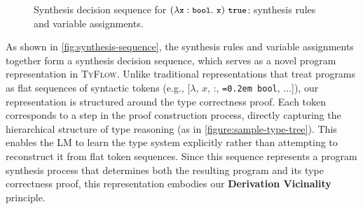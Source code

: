 \documentclass[manuscript,screen]{acmart}
\newcommand{\toolname}[1]{\textsc{#1}}
\newcommand{\tcode}[1]{{\small \texttt{\spaceskip=0.2em #1}}}
\newcommand{\mainname}{\toolname{TyFlow}\xspace}
\begin{document}
\begin{figure}[tb]
\centering
{}

\setlength{\fboxsep}{1pt}
\caption{Synthesis decision sequence for $\app{(\abs{\tcode{x}}{\tcode{bool}}{\tcode{x}})}{\tcode{true}}$: 
\colorbox{gray!15}{\textsf{synthesis rules}} and 
\colorbox{blue!8}{\textsf{variable assignments}}.}
\label{fig:synthesis-sequence}
\end{figure}

As shown in \autoref{fig:synthesis-sequence}, the synthesis rules and variable assignments together form a synthesis decision sequence, which serves as a novel program representation in \mainname. 
Unlike traditional representations that treat programs as flat sequences of syntactic tokens (e.g., [$\lambda$, $x$, :, \tcode{bool}, $\dots$]), our representation is structured around the type correctness proof. Each token corresponds to a step in the proof construction process, directly capturing the hierarchical structure of type reasoning (as in \autoref{figure:sample-type-tree}). This enables the LM to learn the type system explicitly rather than attempting to reconstruct it from flat token sequences. Since this sequence represents a program synthesis process that determines both the resulting program and its type correctness proof, this representation embodies our \textbf{Derivation Vicinality} principle.
\end{document}
